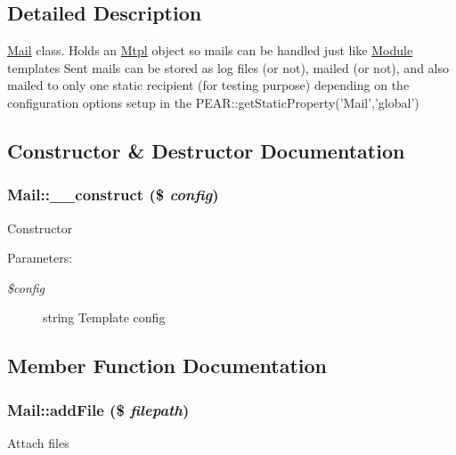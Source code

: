 \subsection{Detailed Description}
\hyperlink{classMail}{Mail} class. Holds an \hyperlink{classMtpl}{Mtpl} object so mails can be handled just like \hyperlink{classModule}{Module} templates Sent mails can be stored as log files (or not), mailed (or not), and also mailed to only one static recipient (for testing purpose) depending on the configuration options setup in the PEAR::getStaticProperty('Mail','global') 

\subsection{Constructor \& Destructor Documentation}
\hypertarget{classMail_a5f231a848f2ccebb489d067a3df64d4}{
\subsubsection[\_\-\_\-construct]{\setlength{\rightskip}{0pt plus 5cm}Mail::\_\-\_\-construct (\$ {\em config})}}
\label{classMail_a5f231a848f2ccebb489d067a3df64d4}


Constructor

\begin{Desc}
\item[Parameters:]
\begin{description}
\item[{\em \$config}]string Template config \end{description}
\end{Desc}


\subsection{Member Function Documentation}
\hypertarget{classMail_a549ce1e7def00b0879bcaf3b8855e4a}{
\subsubsection[addFile]{\setlength{\rightskip}{0pt plus 5cm}Mail::addFile (\$ {\em filepath})}}
\label{classMail_a549ce1e7def00b0879bcaf3b8855e4a}


Attach files

